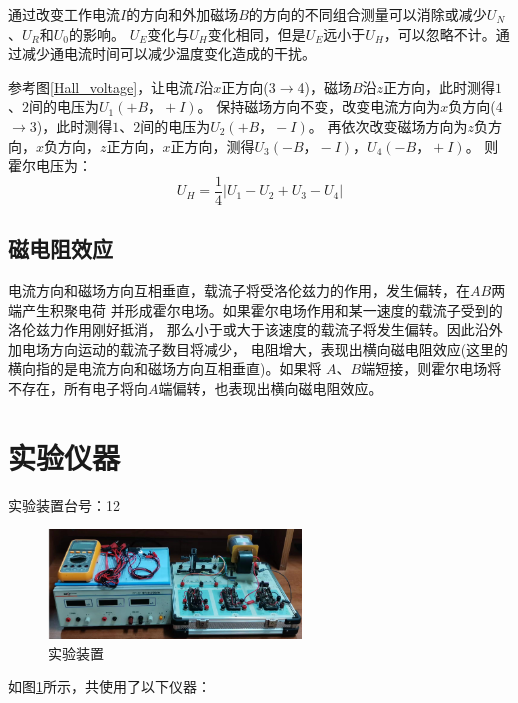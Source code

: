 \documentclass[UTF8]{ctexart}
\begin{document}
通过改变工作电流$I$的方向和外加磁场$B$的方向的不同组合测量可以消除或减少$U_N$、$U_R$和$U_0$的影响。
$U_E$变化与$U_H$变化相同，但是$U_E$远小于$U_H$，可以忽略不计。通过减少通电流时间可以减少温度变化造成的干扰。

参考图\ref{Hall_voltage}，让电流$I$沿$x$正方向(3$\to$4)，磁场$B$沿$z$正方向，此时测得$1$、$2$间的电压为$U_{1}(+B，+I)$。
保持磁场方向不变，改变电流方向为$x$负方向(4$\to$3)，此时测得$1$、$2$间的电压为$U_{2}(+B，-I)$。
再依次改变磁场方向为$z$负方向，$x$负方向，$z$正方向，$x$正方向，测得$U_{3}(-B，-I)$，$U_{4}(-B，+I)$。
则霍尔电压为：$$U_H = \frac{1}{4}|U_1-U_2+U_3-U_4|$$

\subsection{磁电阻效应}

电流方向和磁场方向互相垂直，载流子将受洛伦兹力的作用，发生偏转，在$AB$两端产生积聚电荷
并形成霍尔电场。如果霍尔电场作用和某一速度的载流子受到的洛伦兹力作用刚好抵消，
那么小于或大于该速度的载流子将发生偏转。因此沿外加电场方向运动的载流子数目将减少，
电阻增大，表现出横向磁电阻效应(这里的横向指的是电流方向和磁场方向互相垂直)。如果将
$A$、$B$端短接，则霍尔电场将不存在，所有电子将向$A$端偏转，也表现出横向磁电阻效应。

\section{实验仪器}

实验装置台号：12

\begin{center}
    \begin{figure}[H]
        \centering
        \includegraphics[width=0.6\textwidth]{img/Device.png}
        \caption{实验装置}
        \label{Device}
    \end{figure}
\end{center}

如图\ref{Device}所示，共使用了以下仪器：
\end{document}
